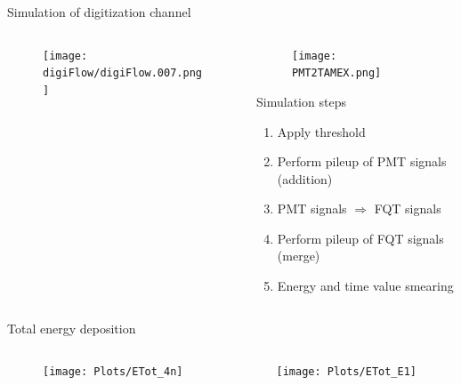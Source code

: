 \documentclass[compress, 13pt, aspectratio=169]{beamer}
\begin{document}
\begin{frame}{Simulation of digitization channel}
    \begin{columns}
        \begin{column}{0.5\textwidth}
            \begin{figure}[t]
                \texttt{[image: digiFlow/digiFlow.007.png]}%
            \end{figure}
        \end{column}
        \begin{column}{0.5\textwidth}
            \begin{figure}[t]
                \texttt{[image: PMT2TAMEX.png]}%
            \end{figure}
            \pause
            \begin{block}{Simulation steps}
                \begin{enumerate}
                    \item<2-> Apply threshold
                    \item<3-> Perform pileup of PMT signals (addition)
                    \item<3-> PMT signals $\Rightarrow$ FQT signals
                    \item<4-> Perform pileup of FQT signals (merge)
                    \item<4-> Energy and time value smearing
                \end{enumerate}
            \end{block}
        \end{column}
    \end{columns}
\end{frame}

\begin{frame}{Total energy deposition}
    \vspace*{-0.7cm}
    \begin{columns}
        \begin{column}{0.5\textwidth}
            \begin{figure}[t]
                \texttt{[image: Plots/ETot\_4n]}%
            \end{figure}
        \end{column}
        \begin{column}{0.5\textwidth}
            \begin{figure}[t]
                \texttt{[image: Plots/ETot\_E1]}%
            \end{figure}
        \end{column}
    \end{columns}
\end{frame}
\end{document}
